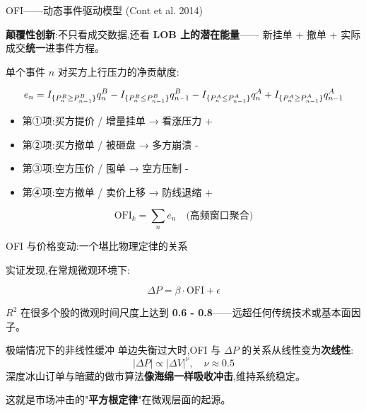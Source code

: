 \documentclass[10pt,aspectratio=169]{beamer}
\begin{document}
\begin{frame}{OFI——动态事件驱动模型 (Cont et al. 2014)}

  \textbf{颠覆性创新}:不只看成交数据,还看 \textbf{LOB 上的潜在能量}——
  新挂单 + 撤单 + 实际成交\textbf{统一}进事件方程。

  \vfill

  单个事件 $n$ 对买方上行压力的净贡献度:

  \[
  \footnotesize
  e_n = I_{\{P_n^B \geq P_{n-1}^B\}} q_n^B - I_{\{P_n^B \leq P_{n-1}^B\}} q_{n-1}^B
       - I_{\{P_n^A \leq P_{n-1}^A\}} q_n^A + I_{\{P_n^A \geq P_{n-1}^A\}} q_{n-1}^A
  \]

  \vfill

  \begin{itemize}
    \item 第①项:买方提价 / 增量挂单 → \textcolor{quantgreen}{看涨压力 +}
    \item 第②项:买方撤单 / 被砸盘 → \textcolor{quantred}{多方崩溃 -}
    \item 第③项:空方压价 / 囤单 → \textcolor{quantred}{空方压制 -}
    \item 第④项:空方撤单 / 卖价上移 → \textcolor{quantgreen}{防线退缩 +}
  \end{itemize}

  \vfill

  \[ \text{OFI}_k = \sum_n e_n \quad\text{(高频窗口聚合)} \]

\end{frame}

\begin{frame}{OFI 与价格变动:一个堪比物理定律的关系}

  实证发现,在常规微观环境下:

  \[
    \boxed{\Delta P = \beta \cdot \text{OFI} + \epsilon}
  \]

  $R^2$ 在很多个股的微观时间尺度上达到 \textbf{0.6 - 0.8}——远超任何传统技术或基本面因子。

  \vfill

  \begin{block}{极端情况下的非线性缓冲}
    单边失衡过大时,OFI 与 $\Delta P$ 的关系从线性变为\textbf{次线性}:
    \[ |\Delta P| \propto |\Delta V|^\nu, \quad \nu \approx 0.5 \]
    深度冰山订单与暗藏的做市算法\textbf{像海绵一样吸收冲击},维持系统稳定。
  \end{block}

  \vfill

  \centering\small
  这就是市场冲击的"\textbf{平方根定律}"在微观层面的起源。

\end{frame}
\end{document}
